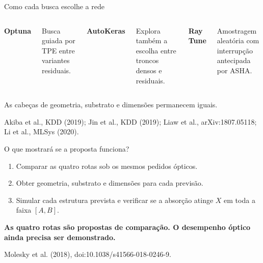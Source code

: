 \documentclass[aspectratio=169,11pt]{beamer}
\newcommand{\source}[1]{\vfill{\tiny\color{navy!65}#1}}
\begin{document}
\begin{frame}{Como cada busca escolhe a rede}
\vspace{2mm}
\begin{columns}[T,onlytextwidth]
\colorbox{teal!10}{\parbox{0.95\linewidth}{\centering\bfseries Optuna}}\par\vspace{5mm}
Busca guiada por TPE entre variantes residuais.
\colorbox{teal!10}{\parbox{0.95\linewidth}{\centering\bfseries AutoKeras}}\par\vspace{5mm}
Explora também a escolha entre troncos densos e residuais.
\colorbox{teal!10}{\parbox{0.95\linewidth}{\centering\bfseries Ray Tune}}\par\vspace{5mm}
Amostragem aleatória com interrupção antecipada por ASHA.
\end{columns}
\vspace{12mm}
\begin{center}{\large As cabeças de geometria, substrato e dimensões permanecem iguais.}\end{center}
\source{Akiba et al., KDD (2019); Jin et al., KDD (2019); Liaw et al., arXiv:1807.05118; Li et al., MLSys (2020).}
\end{frame}
\begin{frame}{O que mostrará se a proposta funciona?}
\vspace{5mm}\begin{enumerate}\setlength{\itemsep}{8mm}
\item Comparar as quatro rotas sob os mesmos pedidos ópticos.
\item Obter geometria, substrato e dimensões para cada previsão.
\item Simular cada estrutura prevista e verificar se a absorção atinge $X$ em toda a faixa $[A,B]$.
\end{enumerate}\vspace{8mm}
\begin{center}\colorbox{teal!10}{\parbox{0.83\textwidth}{\centering\large\bfseries As quatro rotas são propostas de comparação. O desempenho óptico ainda precisa ser demonstrado.}}\end{center}
\source{Molesky et al. (2018), doi:10.1038/s41566-018-0246-9.}
\end{frame}
\end{document}
